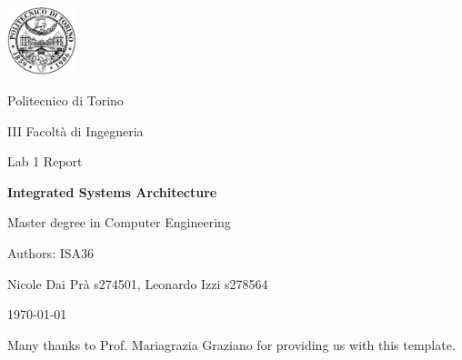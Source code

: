 \documentclass[10pt,  english, makeidx, a4paper, titlepage, oneside]{book}
\begin{document}
\frontmatter
\begin{titlepage}
\vspace{2cm}
\centerline{
\includegraphics[width=2cm]{./logopoli}}  
\centerline{\LARGE Politecnico di Torino}
\bigskip
\centerline{\Large III Facolt\`a di Ingegneria}
\vspace{4cm}
\centerline{\Huge\sf Lab 1 Report}
\bigskip
\centerline{\Huge\bfseries\sf Integrated Systems Architecture}
\vspace{2cm}
\centerline{\LARGE Master degree in Computer Engineering}
\vspace{4.4cm}
%
\centerline{\Large Authors: ISA36}
\vspace{2cm}
%
%
\centerline{Nicole Dai Pr\`a s274501, Leonardo Izzi s278564}
%
\vspace{2cm}
\centerline{\today}
\vspace{1cm}
{\scriptsize Many thanks to Prof. Mariagrazia Graziano for providing us with this template.}
\end{titlepage}

\tableofcontents

% 
\mainmatter
\lstset{language=VHDL}




\end{document}
